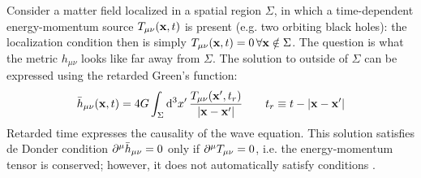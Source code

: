 Consider a matter field localized in a spatial region $ \Sigma $, in which a time-dependent energy-momentum source $ T_{\mu \nu}(\mathbf{x},t) $ is present (e.g. two orbiting black holes): the localization condition then is simply $ T_{\mu \nu}(\mathbf{x},t) = 0 \,\forall \mathbf{x} \notin \Sigma $. The question is what the metric $ h_{\mu \nu} $ looks like far away from $ \Sigma $. The solution to  outside of $ \Sigma $ can be expressed using the retarded Green's function:
\begin{equation}
  \bar{h}_{\mu \nu}(\mathbf{x},t) = 4G \int_\Sigma \mathrm{d}^3 x'\, \frac{T_{\mu \nu}(\mathbf{x}',t_r)}{\left\lvert\mathbf{x} - \mathbf{x}'\right\rvert}
  \qquad t_r \equiv t - \left\lvert\mathbf{x} - \mathbf{x}'\right\rvert
\end{equation}
Retarded time expresses the causality of the wave equation. This solution satisfies de Donder condition $ \partial^\mu \bar{h}_{\mu \nu} = 0 $ only if $ \partial^\mu T_{\mu \nu} = 0 $, i.e. the energy-momentum tensor is conserved; however, it does not automatically satisfy conditions .

